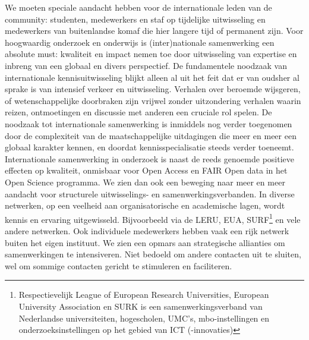 \documentclass[empirical, authordate, ]{new-jote-article}
\begin{document}
	We moeten speciale aandacht hebben voor de internationale leden van de community: studenten, medewerkers en staf op tijdelijke uitwisseling en medewerkers van buitenlandse komaf die hier langere tijd of permanent zijn. Voor hoogwaardig onderzoek en onderwijs is (inter)nationale samenwerking een absolute must: kwaliteit en impact nemen toe door uitwisseling van expertise en inbreng van een globaal en divers perspectief. De fundamentele noodzaak van internationale kennisuitwisseling blijkt alleen al uit het feit dat er van oudsher al sprake is van intensief verkeer en uitwisseling. Verhalen over beroemde wijsgeren, of wetenschappelijke doorbraken zijn vrijwel zonder uitzondering verhalen waarin reizen, ontmoetingen en discussie met anderen een cruciale rol spelen. De noodzaak tot internationale samenwerking is inmiddels nog verder toegenomen door de complexiteit van de maatschappelijke uitdagingen die meer en meer een globaal karakter kennen, en doordat kennisspecialisatie steeds verder toeneemt. Internationale samenwerking in onderzoek is naast de reeds genoemde positieve effecten op kwaliteit, onmisbaar voor Open Access en FAIR Open data in het Open Science programma. We zien dan ook een beweging naar meer en meer aandacht voor structurele uitwisselings- en samenwerkingsverbanden. In diverse netwerken, op een veelheid aan organisatorische en academische lagen, wordt kennis en ervaring uitgewisseld. Bijvoorbeeld via de LERU, EUA, SURF\footnote{Respectievelijk League of European Research Universities, European University Association en SURK is een samenwerkingsverband van Nederlandse universiteiten, hogescholen, UMC's, mbo-instellingen en onderzoeksinstellingen op het gebied van ICT (-innovaties)} en vele andere netwerken. Ook individuele medewerkers hebben vaak een rijk netwerk buiten het eigen instituut. We zien een opmars aan strategische allianties om samenwerkingen te intensiveren. Niet bedoeld om andere contacten uit te sluiten, wel om sommige contacten gericht te stimuleren en faciliteren.
\end{document}

